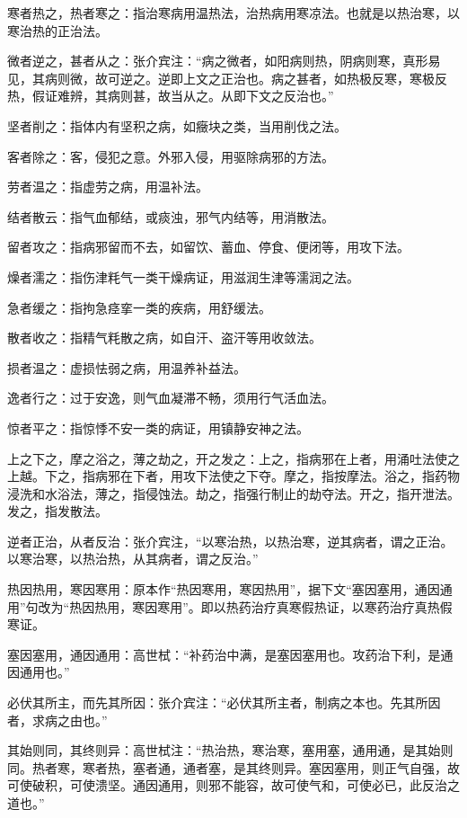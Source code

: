 \documentclass[draft,12pt]{ctexbook}
\begin{document}
\begin{jiaozhu}
  \item 寒者热之，热者寒之：指治寒病用温热法，治热病用寒凉法。也就是以热治寒，以寒治热的正治法。
  \item 微者逆之，甚者从之：张介宾注：“病之微者，如阳病则热，阴病则寒，真形易见，其病则微，故可逆之。逆即上文之正治也。病之甚者，如热极反寒，寒极反热，假证难辨，其病则甚，故当从之。从即下文之反治也。”
  \item 坚者削之：指体内有坚积之病，如癥块之类，当用削伐之法。
  \item 客者除之：客，侵犯之意。外邪入侵，用驱除病邪的方法。
  \item 劳者温之：指虚劳之病，用温补法。
  \item 结者散云：指气血郁结，或痰浊，邪气内结等，用消散法。
  \item 留者攻之：指病邪留而不去，如留饮、蓄血、停食、便闭等，用攻下法。
  \item 燥者濡之：指伤津粍气一类干燥病证，用滋润生津等濡润之法。
  \item 急者缓之：指拘急痉挛一类的疾病，用舒缓法。
  \item 散者收之：指精气粍散之病，如自汗、盗汗等用收敛法。
  \item 损者温之：虚损怯弱之病，用温养补益法。
  \item 逸者行之：过于安逸，则气血凝滞不畅，须用行气活血法。
  \item 惊者平之：指惊悸不安一类的病证，用镇静安神之法。
  \item 上之下之，摩之浴之，薄之劫之，开之发之：上之，指病邪在上者，用涌吐法使之上越。下之，指病邪在下者，用攻下法使之下夺。摩之，指按摩法。浴之，指药物浸洗和水浴法，薄之，指侵蚀法。劫之，指强行制止的劫夺法。开之，指开泄法。发之，指发散法。
  \item 逆者正治，从者反治：张介宾注，“以寒治热，以热治寒，逆其病者，谓之正治。以寒治寒，以热治热，从其病者，谓之反治。”
  \item 热因热用，寒因寒用：原本作“热因寒用，寒因热用”，据下文“塞因塞用，通因通用”句改为“热因热用，寒因寒用”。即以热药治疗真寒假热证，以寒药治疗真热假寒证。
  \item 塞因塞用，通因通用：高世栻：“补药治中满，是塞因塞用也。攻药治下利，是通因通用也。”
  \item 必伏其所主，而先其所因：张介宾注：“必伏其所主者，制病之本也。先其所因者，求病之由也。”
  \item 其始则同，其终则异：高世栻注：“热治热，寒治寒，塞用塞，通用通，是其始则同。热者寒，寒者热，塞者通，通者塞，是其终则异。塞因塞用，则正气自强，故可使破积，可使溃坚。通因通用，则邪不能容，故可使气和，可使必已，此反治之道也。”

\end{jiaozhu}
\end{document}
